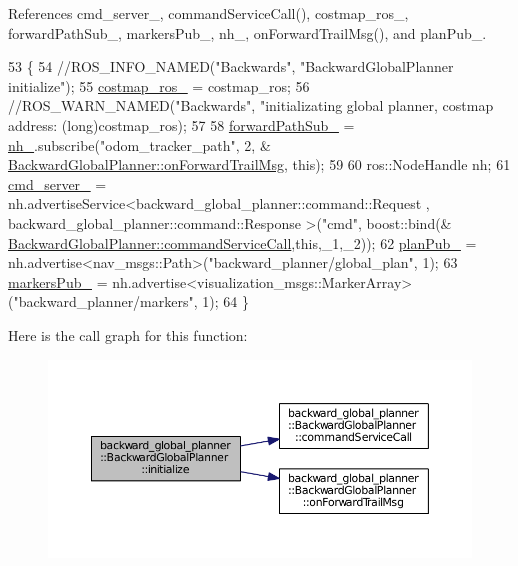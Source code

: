 References cmd\+\_\+server\+\_\+, command\+Service\+Call(), costmap\+\_\+ros\+\_\+, forward\+Path\+Sub\+\_\+, markers\+Pub\+\_\+, nh\+\_\+, on\+Forward\+Trail\+Msg(), and plan\+Pub\+\_\+.


\begin{DoxyCode}
53 \{
54     \textcolor{comment}{//ROS\_INFO\_NAMED("Backwards", "BackwardGlobalPlanner initialize");}
55     \hyperlink{classbackward__global__planner_1_1BackwardGlobalPlanner_afacbfb009c468d3c47959ca413eb6606}{costmap\_ros\_} = costmap\_ros;
56     \textcolor{comment}{//ROS\_WARN\_NAMED("Backwards", "initializating global planner, costmap address: %
       (long)costmap\_ros);}
57 
58     \hyperlink{classbackward__global__planner_1_1BackwardGlobalPlanner_ac4f74dedbfaa1034fa4cffa6d27640e7}{forwardPathSub\_} = \hyperlink{classbackward__global__planner_1_1BackwardGlobalPlanner_a4e828d988f4c66711e3144d210d2f80a}{nh\_}.subscribe(\textcolor{stringliteral}{"odom\_tracker\_path"}, 2, &
      \hyperlink{classbackward__global__planner_1_1BackwardGlobalPlanner_a093adf2db8ab6ca7a2fed8bd18eb9ded}{BackwardGlobalPlanner::onForwardTrailMsg}, \textcolor{keyword}{this});
59     
60     ros::NodeHandle nh;
61     \hyperlink{classbackward__global__planner_1_1BackwardGlobalPlanner_a7d9647a5c5e35794af7ebc14827f5b35}{cmd\_server\_} = nh.advertiseService<backward\_global\_planner::command::Request , 
      backward\_global\_planner::command::Response  >(\textcolor{stringliteral}{"cmd"}, boost::bind(&
      \hyperlink{classbackward__global__planner_1_1BackwardGlobalPlanner_a2c317353dfc5afdd585c26a7c18abb62}{BackwardGlobalPlanner::commandServiceCall},\textcolor{keyword}{this},\_1,\_2));
62     \hyperlink{classbackward__global__planner_1_1BackwardGlobalPlanner_ad51fd6aecf673a500ec828b796d68228}{planPub\_} = nh.advertise<nav\_msgs::Path>(\textcolor{stringliteral}{"backward\_planner/global\_plan"}, 1);
63     \hyperlink{classbackward__global__planner_1_1BackwardGlobalPlanner_a02e3724cf09622d3f107e3476040add4}{markersPub\_} = nh.advertise<visualization\_msgs::MarkerArray>(\textcolor{stringliteral}{"backward\_planner/markers"}, 1);
64 \}
\end{DoxyCode}


Here is the call graph for this function\+:
\nopagebreak
\begin{figure}[H]
\begin{center}
\leavevmode
\includegraphics[width=350pt]{classbackward__global__planner_1_1BackwardGlobalPlanner_ac0dfce1f9ba6d39a3b37ea6c99fac2ae_cgraph}
\end{center}
\end{figure}


